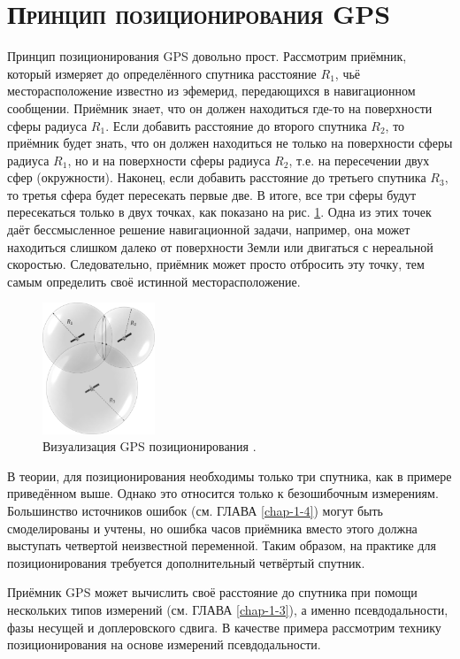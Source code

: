 \section{\textsc{Принцип позиционирования GPS}}

Принцип позиционирования GPS довольно прост.
Рассмотрим приёмник, который измеряет до определённого спутника расстояние $R_1$, чьё месторасположение известно из эфемерид, передающихся в навигационном сообщении.
Приёмник знает, что он должен находиться где-то на поверхности сферы радиуса $R_1$.
Если добавить расстояние до второго спутника $R_2$, то приёмник будет знать, что он должен находиться не только на поверхности сферы радиуса $R_1$, но и на поверхности сферы радиуса $R_2$, т.е. на пересечении двух сфер (окружности).
Наконец, если добавить расстояние до третьего спутника $R_3$, то третья сфера будет пересекать первые две.
В итоге, все три сферы будут пересекаться только в двух точках, как показано на рис. \ref{fig-positioning}.
Одна из этих точек даёт бессмысленное решение навигационной задачи, например, она может находиться слишком далеко от поверхности Земли или двигаться с нереальной скоростью.
Следовательно, приёмник может просто отбросить эту точку, тем самым определить своё истинной месторасположение. 
\begin{figure}[h]
\centering    
\includegraphics[width=0.3\textwidth]{fig/positioning.png}    
\caption{Визуализация GPS позиционирования \cite{Seeber2003}.}
\label{fig-positioning}      
\end{figure}

В теории, для позиционирования необходимы только три спутника, как в примере приведённом выше.
Однако это относится только к безошибочным измерениям.
Большинство источников ошибок (см. ГЛАВА \ref{chap-1-4}) могут быть смоделированы и учтены, но ошибка часов приёмника вместо этого должна выступать четвертой неизвестной переменной.
Таким образом, на практике для позиционирования требуется дополнительный четвёртый спутник.

Приёмник GPS может вычислить своё расстояние до спутника при помощи нескольких типов измерений (см. ГЛАВА \ref{chap-1-3}), а именно псевдодальности, фазы несущей и доплеровского сдвига.
В качестве примера рассмотрим технику позиционирования на основе измерений псевдодальности.

